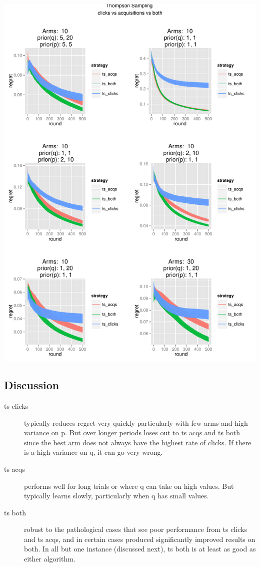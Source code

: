 \documentclass[11pt,a4,singlespacing,titlepagenumber=on]{scrreprt}
\numberwithin{equation}{chapter} %
\theoremstyle{remark}
\begin{document}
\includegraphics[scale=0.7]{P1to6.pdf}

\subsection{Discussion}

\begin{description}
	\item[ts clicks] typically reduces regret very quickly particularly with few arms and high variance on p. But over longer periods loses out to ts acqs and ts both since the best arm does not always have the highest rate of clicks. If there is a high variance on q, it can go very wrong.
	\item[ts acqs] performs well for long trials or where q can take on high values. But typically learns slowly, particularly when q has small values.
	\item[ts both] robust to the pathological cases that see poor performance from ts clicks and ts acqs, and in certain cases produced significantly improved results on both. In all but one instance (discussed next), ts both is at least as good as either algorithm.

\end{description}
\end{document}

